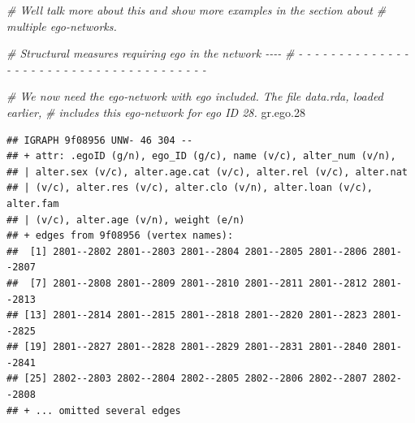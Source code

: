 \documentclass[
]{book}
\newenvironment{Shaded}{\begin{snugshade}}{\end{snugshade}}
\newcommand{\AttributeTok}[1]{\textcolor[rgb]{0.77,0.63,0.00}{#1}}
\newcommand{\CommentTok}[1]{\textcolor[rgb]{0.56,0.35,0.01}{\textit{#1}}}
\newcommand{\ConstantTok}[1]{\textcolor[rgb]{0.00,0.00,0.00}{#1}}
\newcommand{\FloatTok}[1]{\textcolor[rgb]{0.00,0.00,0.81}{#1}}
\newcommand{\FunctionTok}[1]{\textcolor[rgb]{0.00,0.00,0.00}{#1}}
\newcommand{\NormalTok}[1]{#1}
\newcommand{\OtherTok}[1]{\textcolor[rgb]{0.56,0.35,0.01}{#1}}
\newcommand{\StringTok}[1]{\textcolor[rgb]{0.31,0.60,0.02}{#1}}
\begin{document}
\begin{Shaded}
\begin{Highlighting}[]
\CommentTok{\# We\textquotesingle{}ll talk more about this and show more examples in the section about }
\CommentTok{\# multiple ego{-}networks.}

\CommentTok{\# Structural measures requiring ego in the network                          {-}{-}{-}{-}}
\CommentTok{\# {-} {-} {-} {-} {-} {-} {-} {-} {-} {-} {-} {-} {-} {-} {-} {-} {-} {-} {-} {-} {-} {-} {-} {-} {-} {-} {-} {-} {-} {-} {-} {-} {-} {-} {-} {-} {-} {-} {-} }

\CommentTok{\# We now need the ego{-}network with ego included. The file data.rda, loaded earlier,}
\CommentTok{\# includes this ego{-}network for ego ID 28. }
\NormalTok{gr.ego}\FloatTok{.28}
\end{Highlighting}
\end{Shaded}

\begin{verbatim}
## IGRAPH 9f08956 UNW- 46 304 -- 
## + attr: .egoID (g/n), ego_ID (g/c), name (v/c), alter_num (v/n),
## | alter.sex (v/c), alter.age.cat (v/c), alter.rel (v/c), alter.nat
## | (v/c), alter.res (v/c), alter.clo (v/n), alter.loan (v/c), alter.fam
## | (v/c), alter.age (v/n), weight (e/n)
## + edges from 9f08956 (vertex names):
##  [1] 2801--2802 2801--2803 2801--2804 2801--2805 2801--2806 2801--2807
##  [7] 2801--2808 2801--2809 2801--2810 2801--2811 2801--2812 2801--2813
## [13] 2801--2814 2801--2815 2801--2818 2801--2820 2801--2823 2801--2825
## [19] 2801--2827 2801--2828 2801--2829 2801--2831 2801--2840 2801--2841
## [25] 2802--2803 2802--2804 2802--2805 2802--2806 2802--2807 2802--2808
## + ... omitted several edges
\end{verbatim}

\begin{Shaded}
\end{Shaded}
\end{document}
